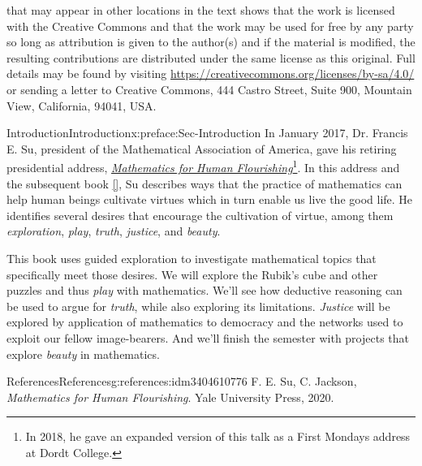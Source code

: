 \documentclass[oneside,10pt,]{book}
\newcommand{\xreffont}{\relax}
\numberwithin{equation}{section}
\begin{document}
 that may appear in other locations in the text shows that the work is licensed with the Creative Commons and that the work may be used for free by any party so long as attribution is given to the author(s) and if the material is modified, the resulting contributions are distributed under the same license as this original. Full details may be found by visiting \href{https://creativecommons.org/licenses/by-sa/4.0/}{https:\slash{}\slash{}creativecommons.org\slash{}licenses\slash{}by-sa\slash{}4.0\slash{}}  or sending a letter to Creative Commons, 444 Castro Street, Suite 900, Mountain View, California, 94041, USA.\par\medskip
{}
\null\clearpage
%
%
\typeout{************************************************}
\typeout{************************************************}
%
\begin{preface}{Introduction}{}{Introduction}{}{}{x:preface:Sec-Introduction}
In January 2017, Dr. Francis E. Su, president of the Mathematical Association of America, gave his retiring presidential address, \emph{\href{https://mathyawp.wordpress.com/2017/01/08/mathematics-for-human-flourishing/}{Mathematics for Human Flourishing}}\footnote{In 2018, he gave an expanded version of this talk as a First Mondays address at Dordt College.\label{g:fn:idm3404616792}}. In this address and the subsequent book \hyperlink{x:biblio:Su2020}{[{\xreffont 1}]}, Su describes ways that the practice of mathematics can help human beings cultivate virtues which in turn enable us live the good life. He identifies several desires that encourage the cultivation of virtue, among them \emph{exploration}, \emph{play}, \emph{truth}, \emph{justice}, and \emph{beauty}.%
\par
This book uses guided exploration to investigate mathematical topics that specifically meet those desires. We will explore the Rubik's cube and other puzzles and thus \emph{play} with mathematics. We'll see how deductive reasoning can be used to argue for \emph{truth}, while also exploring its limitations. \emph{Justice} will be explored by application of mathematics to democracy and the networks used to exploit our fellow image-bearers. And we'll finish the semester with projects that explore \emph{beauty} in mathematics.%
%
%
\typeout{************************************************}
\typeout{************************************************}
%
\begin{references--numberless}{References}{}{References}{}{}{g:references:idm3404610776}
F. E. Su, C. Jackson, \emph{Mathematics for Human Flourishing}. Yale University Press, 2020.\end{references--numberless}
\end{preface}
\end{document}
